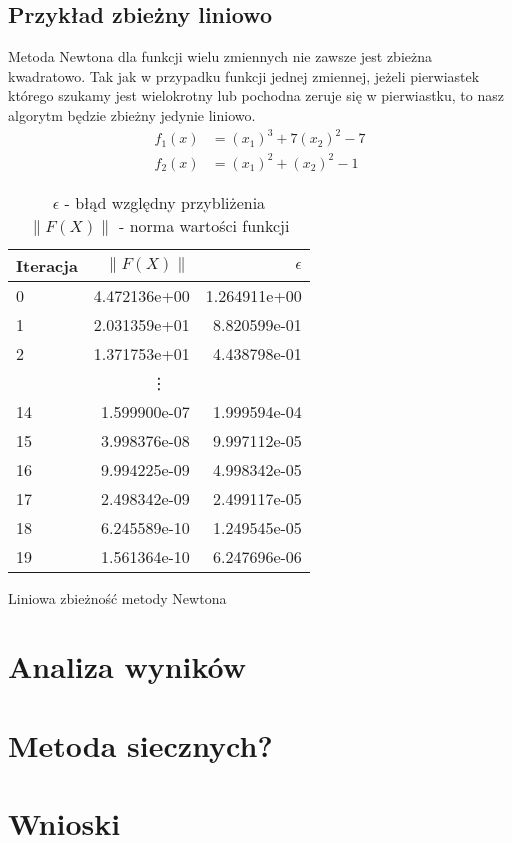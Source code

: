 \documentclass[11pt,wide]{mwart}
\begin{document}
\subsection{Przykład zbieżny liniowo}
Metoda Newtona dla funkcji wielu zmiennych nie zawsze jest zbieżna kwadratowo. Tak jak w przypadku funkcji jednej zmiennej, jeżeli pierwiastek którego szukamy jest wielokrotny lub pochodna zeruje się w pierwiastku, to nasz algorytm będzie zbieżny jedynie liniowo.
\begin{align*}
	f_1(x) &= (x_1)^3 + 7(x_2)^2 - 7 \\
	f_2(x) &= (x_1)^2 + (x_2)^2 - 1
\end{align*}
\begin{table}[h]
\centering
\begin{tabular}{| l | r | r |} \hline
Iteracja & $\|F(X)\|$ & $\epsilon$ \\ \hline
0 & 4.472136e+00 & 1.264911e+00 \\ \hline
1 & 2.031359e+01 & 8.820599e-01 \\ \hline
2 & 1.371753e+01 & 4.438798e-01 \\
\multicolumn{3}{|c|}{\vdots} \\
14 & 1.599900e-07 & 1.999594e-04 \\ \hline
15 & 3.998376e-08 & 9.997112e-05 \\ \hline
16 & 9.994225e-09 & 4.998342e-05 \\ \hline
17 & 2.498342e-09 & 2.499117e-05 \\ \hline
18 & 6.245589e-10 & 1.249545e-05 \\ \hline
19 & 1.561364e-10 & 6.247696e-06 \\ \hline
\end{tabular}
\caption{Liniowa zbieżność metody Newtona}
\caption*{$ \epsilon $ - błąd względny przybliżenia\\$\|F(X)\|$ - norma wartości funkcji}
\end{table}
\section{Analiza wyników}
\section{Metoda siecznych?}
\section{Wnioski}
\end{document}
